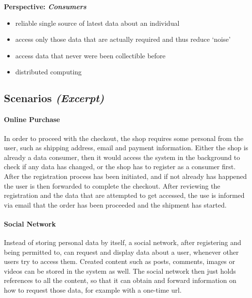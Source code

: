 \documentclass[12pt,english,a4paper,titlepage,cleardoublepage=empty,dottedtoc]{report}
\providecommand{\tightlist}{%
  \setlength{\itemsep}{0pt}\setlength{\parskip}{0pt}}
\begin{document}
\textbf{Perspective: \emph{Consumers}}

\begin{itemize}
\tightlist
\item
  reliable single source of latest data about an individual
\item
  access only those data that are actually required and thus reduce
  `noise'
\item
  access data that never were been collectible before
\item
  distributed computing
\end{itemize}

\subsection{\texorpdfstring{Scenarios
\emph{(Excerpt)}}{Scenarios (Excerpt)}}\label{scenarios-excerpt}

\paragraph{Online Purchase}\label{online-purchase}

In order to proceed with the checkout, the shop requires some personal
from the user, such as shipping address, email and payment information.
Either the shop is already a data consumer, then it would access the
system in the background to check if any data has changed, or the shop
has to register as a consumer first. After the registration process has
been initiated, and if not already has happened the user is then
forwarded to complete the checkout. After reviewing the registration and
the data that are attempted to get accessed, the use is informed via
email that the order has been proceeded and the shipment has started.

\paragraph{Social Network}\label{social-network}

Instead of storing personal data by itself, a social network, after
registering and being permitted to, can request and display data about a
user, whenever other users try to access them. Created content such as
posts, comments, images or videos can be stored in the system as well.
The social network then just holds references to all the content, so
that it can obtain and forward information on how to request those data,
for example with a one-time url.
\end{document}
